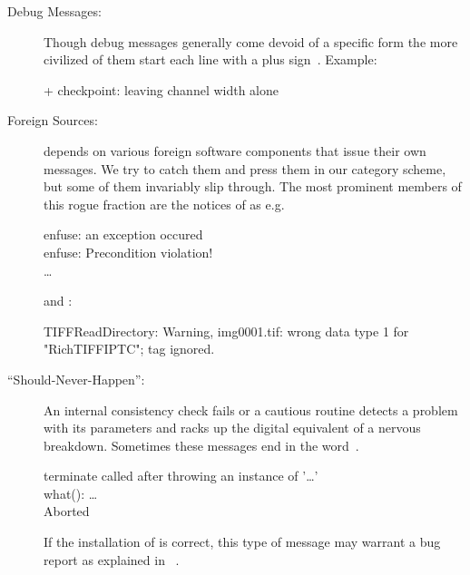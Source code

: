 \begin{description}
\item[Debug Messages:] Though debug messages generally come devoid of a specific form the more
  civilized of them start each line with a plus sign~\sample{+}.  Example:

  \begin{literal}
    + checkpoint: leaving channel width alone
  \end{literal}

\item[Foreign Sources:] \appcmd{} depends on various foreign software components that issue
  their own messages.  We try to catch them and press them in our category scheme, but some of
  them invariably slip through.  The most prominent members of this rogue fraction are the
  notices of  as e.g.

  \begin{literal}
    enfuse: an exception occured \\
    enfuse: Precondition violation! \\
    \dots
  \end{literal}

  and :

  \begin{literal}
    TIFFReadDirectory: Warning, img0001.tif: wrong data type 1 for "RichTIFFIPTC"; tag ignored.
  \end{literal}

\item[``Should-Never-Happen'':] An internal consistency check fails or a cautious routine
  detects a problem with its parameters and racks up the digital equivalent of a nervous
  breakdown.  Sometimes these messages end in the word~.

  \begin{literal}
    terminate called after throwing an instance of '\dots' \\
    what(): \dots \\
    Aborted
  \end{literal}

  If the installation of \appcmd{} is correct, this type of message may warrant a bug report as
  explained in \appendixName~.
\end{description}

